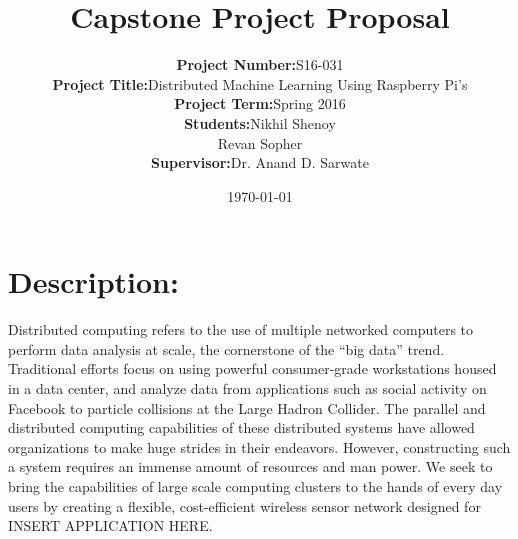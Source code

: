 \documentclass[12pt,draft]{report}
\begin{document}
\title{Capstone Project Proposal}

\author{\begin{tabular}{rl}
	\textbf{Project Number:} & S16-031 \\
	\textbf{Project Title:} & Distributed Machine Learning Using Raspberry Pi’s \\
	\textbf{Project Term:} & Spring 2016 \\
	\textbf{Students:} & Nikhil Shenoy \\ & Revan Sopher \\
	\textbf{Supervisor:} & Dr. Anand D. Sarwate \\
\end{tabular}}

\date{\today}
\maketitle

\newpage

\section*{Description:}

Distributed computing refers to the use of multiple networked computers to perform data analysis at scale, the cornerstone of the “big data” trend. Traditional efforts focus on using powerful consumer-grade workstations housed in a data center, and analyze data from applications such as social activity on Facebook to particle collisions at the Large Hadron Collider. The parallel and distributed computing capabilities of these distributed systems have allowed organizations to make huge strides in their endeavors. However, constructing such a system requires an immense amount of resources and man power. We seek to bring the capabilities of large scale computing clusters to the hands of every day users by creating a flexible, cost-efficient wireless sensor network designed for INSERT APPLICATION HERE.
\end{document}
